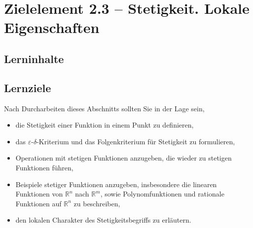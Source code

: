 \documentclass[a4paper,12pt]{article}
\begin{document}
\newpage

\section*{Zielelement 2.3 -- Stetigkeit. Lokale Eigenschaften}

\subsection*{Lerninhalte}

\begin{center}
\end{center}

\subsection*{Lernziele}

Nach Durcharbeiten dieses Abschnitts sollten Sie in der Lage sein,
\begin{itemize}
  \item die Stetigkeit einer Funktion in einem Punkt zu definieren,
  \item das $\varepsilon$-$\delta$-Kriterium und das Folgenkriterium für Stetigkeit
        zu formulieren,
  \item Operationen mit stetigen Funktionen anzugeben, die wieder zu stetigen
        Funktionen führen,
  \item Beispiele stetiger Funktionen anzugeben, insbesondere die linearen Funktionen
        von $\mathbb{R}^n$ nach $\mathbb{R}^m$, sowie Polynomfunktionen und rationale
        Funktionen auf $\mathbb{R}^n$ zu beschreiben,
  \item den lokalen Charakter des Stetigkeitsbegriffs zu erläutern.
\end{itemize}
\end{document}
